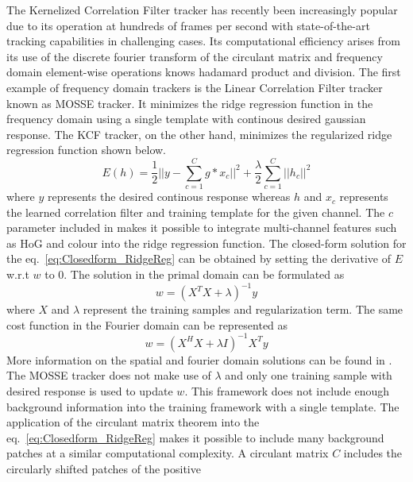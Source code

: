 \documentclass[10pt,twocolumn,letterpaper]{article}
\newcounter{ct}
\begin{document}
The Kernelized Correlation Filter tracker has recently been
increasingly popular due to its operation at hundreds of frames per
second with state-of-the-art tracking capabilities in challenging
cases. Its computational efficiency arises from its use of the
discrete fourier transform of the circulant matrix and frequency
domain element-wise operations knows hadamard product and
division. The first example of frequency domain trackers is the Linear
Correlation Filter tracker known as MOSSE tracker. It minimizes the
ridge regression function in the frequency domain using a single
template with continous desired gaussian response. The KCF tracker, on
the other hand, minimizes the regularized ridge regression function
shown below.
\begin{equation}
E(h) = \frac{1}{2}||y-\sum_{c=1}^{C}g*x_{c}||^{2} + \frac{\lambda}{2}\sum_{c=1}^{C}||h_{c}||^{2}
\label{eq:Closedform_RidgeReg}
\end{equation}
where $y$ represents the desired continous response whereas $h$ and
$x_{c}$ represents the learned correlation filter and training
template for the given channel. The $c$ parameter included in
\cite{henriques2015high,galoogahi2013multi} makes it possible to
integrate multi-channel features such as HoG and colour into the ridge
regression function. The closed-form solution for the
eq.~\ref{eq:Closedform_RidgeReg} can be obtained by setting the
derivative of $E$ w.r.t $w$ to $0$. The solution in the primal domain
can be formulated as
\begin{equation}
w = (X^{T}X+\lambda)^{-1}y
\label{eq:SpatialSolution}
\end{equation}
where $X$ and $\lambda$ represent the training samples and
regularization term. The same cost function in the Fourier domain can
be represented as
\begin{equation}
w = (X^{H}X+\lambda I)^{-1}X^{T}y
\label{eq:FourierSolution}
\end{equation}
More information on the spatial and fourier domain solutions can be
found in \cite{henriques2015high}. The MOSSE tracker does not make use
of $\lambda$ and only one training sample with desired response is
used to update $w$. This framework does not include enough background
information into the training framework with a single template. The
application of the circulant matrix theorem into the
eq.~\ref{eq:Closedform_RidgeReg} makes it possible to include many
background patches at a similar computational complexity. A circulant
matrix $C$ includes the circularly shifted patches of the positive
\end{document}

